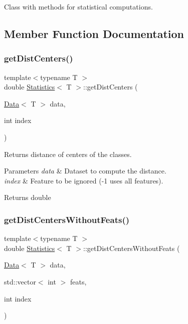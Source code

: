 Class with methods for statistical computations. 

\subsection{Member Function Documentation}
\mbox{\label{class_statistics_ac7673aaf51acf57cfc240cb213f4b30f}} 
\subsubsection{\texorpdfstring{get\+Dist\+Centers()}{getDistCenters()}}
{\footnotesize\ttfamily template$<$typename T $>$ \\
double \hyperlink{class_statistics}{Statistics}$<$ T $>$\+::get\+Dist\+Centers (\begin{DoxyParamCaption}\item[{\hyperlink{class_data}{Data}$<$ T $>$}]{data,  }\item[{int}]{index }\end{DoxyParamCaption})\hspace{0.3cm}{\ttfamily [static]}}



Returns distance of centers of the classes. 


\begin{DoxyParams}{Parameters}
{\em data} & Dataset to compute the distance. \\
\hline
{\em index} & Feature to be ignored (-\/1 uses all features). \\
\hline
\end{DoxyParams}
\begin{DoxyReturn}{Returns}
double 
\end{DoxyReturn}
\mbox{\label{class_statistics_a781ebfca723e5c57db495635225363e6}} 
\subsubsection{\texorpdfstring{get\+Dist\+Centers\+Without\+Feats()}{getDistCentersWithoutFeats()}}
{\footnotesize\ttfamily template$<$typename T $>$ \\
double \hyperlink{class_statistics}{Statistics}$<$ T $>$\+::get\+Dist\+Centers\+Without\+Feats (\begin{DoxyParamCaption}\item[{\hyperlink{class_data}{Data}$<$ T $>$}]{data,  }\item[{std\+::vector$<$ int $>$}]{feats,  }\item[{int}]{index }\end{DoxyParamCaption})\hspace{0.3cm}{\ttfamily [static]}}



